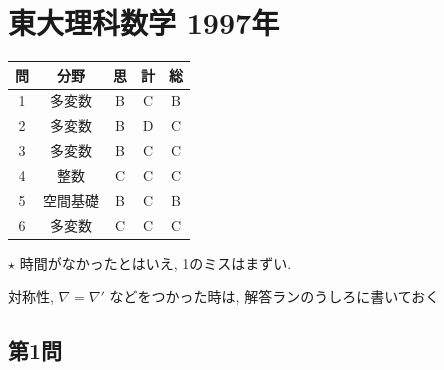 \documentclass[../main.tex]{subfiles}
\begin{document}
\section*{東大理科数学 1997年}

\begin{center}
  \begin{tabular}{|c|c|c|c|c|}
    \hline
    問 & 分野 & 思 & 計 & 総 \\ \hline
    1 & 多変数 & B & C & B \\ \hline
    2 & 多変数 & B & D & C \\ \hline
    3 & 多変数 & B & C & C \\ \hline
    4 & 整数 & C & C & C \\ \hline
    5 & 空間基礎 & B & C & B \\ \hline
    6 & 多変数 & C & C & C \\ \hline
  \end{tabular}
\end{center}

\bigskip

\noindent
$\star$ 時間がなかったとはいえ, 1のミスはまずい.

\begin{center}
  \begin{framed}
    対称性, $\nabla = \nabla'$ などをつかった時は, 解答ランのうしろに書いておく
  \end{framed}
\end{center}

\newpage

\subsection*{第1問}
\end{document}
